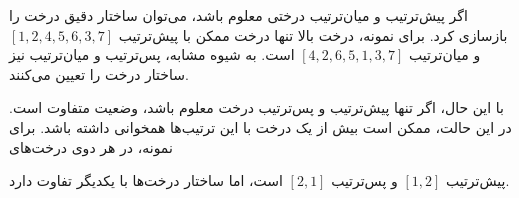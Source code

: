 اگر پیش‌ترتیب و میان‌ترتیب درختی معلوم باشد، می‌توان ساختار دقیق درخت را بازسازی کرد.
برای نمونه، درخت بالا تنها درخت ممکن با
پیش‌ترتیب $[1,2,4,5,6,3,7]$ و
میان‌ترتیب $[4,2,6,5,1,3,7]$ است.
به شیوه مشابه، پس‌ترتیب و میان‌ترتیب نیز ساختار درخت را تعیین می‌کنند.

با این حال، اگر تنها پیش‌ترتیب و پس‌ترتیب درخت معلوم باشد، وضعیت متفاوت است.
در این حالت، ممکن است بیش از یک درخت با این ترتیب‌ها همخوانی داشته باشد.
برای نمونه، در هر دوی درخت‌های
\begin{center}
\end{center}
پیش‌ترتیب $[1,2]$ و پس‌ترتیب $[2,1]$ است،
اما ساختار درخت‌ها با یکدیگر تفاوت دارد.